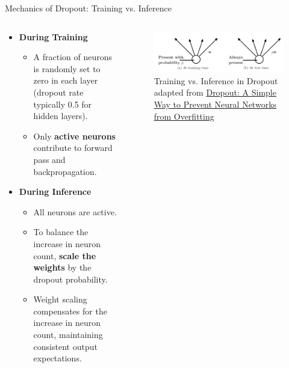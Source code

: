 \documentclass[serif, aspectratio=169]{beamer}
\begin{document}
\begin{frame}{Mechanics of Dropout: Training vs. Inference}
    \begin{columns}
        \begin{column}{0.5\textwidth}
            \begin{itemize}
                \item \textbf{During Training}
                \begin{itemize}
                    \item A fraction of neurons is randomly set to zero in each layer (dropout rate typically 0.5 for hidden layers).
                    \item Only \textbf{active neurons} contribute to forward pass and backpropagation.
                \end{itemize}
                \item \textbf{During Inference}
                \begin{itemize}
                    \item All neurons are active.
                    \item To balance the increase in neuron count, \textbf{scale the weights} by the dropout probability.
                    \item Weight scaling compensates for the increase in neuron count, maintaining consistent output expectations.
                \end{itemize}
            \end{itemize}
        \end{column}
        
        \begin{column}{0.5\textwidth}
            \begin{figure}
                \includegraphics[width=\textwidth]{pic/dropout/test-train.png}
                \caption{Training vs. Inference in Dropout adapted from \href{https://jmlr.org/papers/v15/srivastava14a.html}{Dropout: A Simple Way to Prevent Neural Networks from Overfitting}}
                \label{fig:Dropout}
            \end{figure}
        \end{column}
    \end{columns}
\end{frame}
\end{document}
